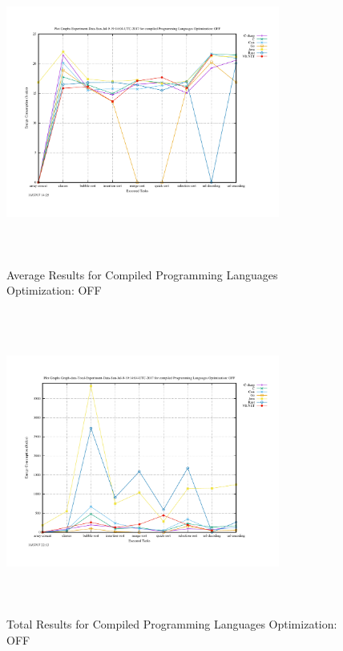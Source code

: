 \begin{figure}
	\centering
	\includegraphics[width=9cm,height=10cm,keepaspectratio]{"Graph_Experiment-Data-Sun-Jul-9-19:14:04-UTC-2017_compiled_Optimization_OFF"}
	\caption{Average Results for Compiled Programming Languages Optimization: OFF}
	\label{Compiled with No Optimization}
\end{figure}

\begin{figure}
	\centering
	\includegraphics[width=9cm,height=10cm,keepaspectratio]{"Graph_Graph-data-Total-Experiment-Data-Sun-Jul-9-19:14:04-UTC-2017_compiled_Optimization_OFF"}
	\caption{Total Results for Compiled Programming Languages Optimization: OFF}
	\label{Compiled with No Optimization Total}
\end{figure}

